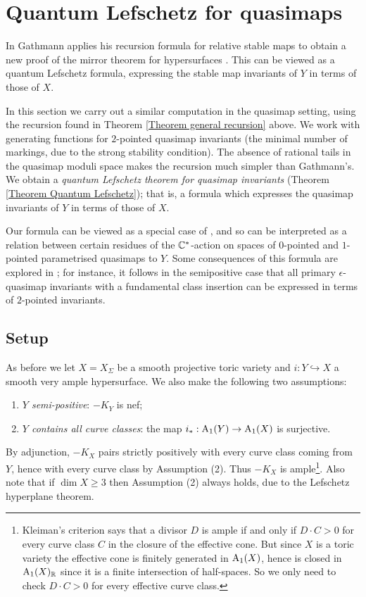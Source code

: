 \section{Quantum Lefschetz for quasimaps} \label{Section quasimap mirror theorem}

In \cite{Ga-MF} Gathmann applies his recursion formula for relative stable maps to obtain a new proof of the mirror theorem for hypersurfaces \cite{Givental-mirror} \cite{LLY1}. This can be viewed as a quantum Lefschetz formula, expressing the stable map invariants of $Y$ in terms of those of $X$.

In this section we carry out a similar computation in the quasimap setting, using the recursion found in Theorem \ref{Theorem general recursion} above. We work with generating functions for $2$-pointed quasimap invariants (the minimal number of markings, due to the strong stability condition). The absence of rational tails in the quasimap moduli space makes the recursion much simpler than Gathmann's. We obtain a \emph{quantum Lefschetz theorem for quasimap invariants} (Theorem \ref{Theorem Quantum Lefschetz}); that is, a formula which expresses the quasimap invariants of $Y$ in terms of those of $X$.

Our formula can be viewed as a special case of \cite[Corollary 5.5.1]{CF-K-wallcrossing}, and so can be interpreted as a relation between certain residues of the $\mathbb{C}^*$-action on spaces of $0$-pointed and $1$-pointed parametrised quasimaps to $Y$. Some consequences of this formula are explored in \cite[Section 5.5]{CF-K-wallcrossing}; for instance, it follows in the semipositive case that all primary $\epsilon$-quasimap invariants with a fundamental class insertion can be expressed in terms of $2$-pointed invariants.

\subsection{Setup}
As before we let $X=X_{\Sigma}$ be a smooth projective toric variety and $i \colon Y \hookrightarrow X$ a smooth very ample hypersurface. We also make the following two assumptions:
\begin{enumerate}
\item \emph{$Y$ semi-positive}: $-K_Y$ is nef;
\item \emph{$Y$ contains all curve classes}: the map $i_* : \operatorname{A}_1(Y) \rightarrow \operatorname{A}_1(X)$ is surjective.
\end{enumerate}
By adjunction, $-K_X$ pairs strictly positively with every curve class coming from $Y$, hence with every curve class by Assumption (2). Thus $-K_X$ is ample\footnote{Kleiman's criterion says that a divisor $D$ is ample if and only if $D \cdot C > 0$ for every curve class $C$ in the closure of the effective cone. But since $X$ is a toric variety the effective cone is finitely generated in $\operatorname{A}_1(X)$, hence is closed in $\operatorname{A}_1(X)_{\mathbb{R}}$ since it is a finite intersection of half-spaces. So we only need to check $D \cdot C > 0$ for every effective curve class.}. Also note that if $\dim X \geq 3$ then Assumption (2) always holds, due to the Lefschetz hyperplane theorem.

